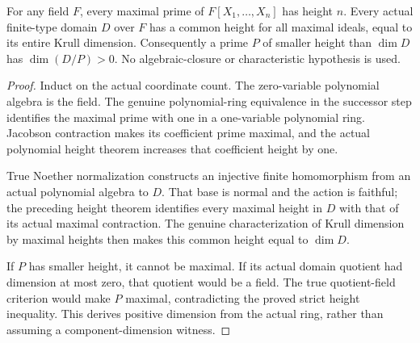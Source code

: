 \begin{theorem}
\label{algebra:affine-domain-maximal-height}
\leanok
{}
For any field $F$, every maximal prime of $F[X_1,\ldots,X_n]$ has
height $n$. Every actual finite-type domain $D$ over $F$ has a common
height for all maximal ideals, equal to its entire Krull dimension.
Consequently a prime $P$ of smaller height than $\dim D$ has
$\dim(D/P)>0$. No algebraic-closure or characteristic hypothesis is used.
\end{theorem}
\begin{proof}
Induct on the actual coordinate count. The zero-variable polynomial
algebra is the field. The genuine polynomial-ring equivalence in the
successor step identifies the maximal prime with one in a one-variable
polynomial ring. Jacobson contraction makes its coefficient prime
maximal, and the actual polynomial height theorem increases that
coefficient height by one.

True Noether normalization constructs an injective finite homomorphism
from an actual polynomial algebra to $D$. That base is normal and the
action is faithful; the preceding height theorem identifies every
maximal height in $D$ with that of its actual maximal contraction.
The genuine characterization of Krull dimension by maximal heights
then makes this common height equal to $\dim D$.

If $P$ has smaller height, it cannot be maximal. If its actual domain
quotient had dimension at most zero, that quotient would be a field.
The true quotient-field criterion would make $P$ maximal, contradicting
the proved strict height inequality. This derives positive dimension
from the actual ring, rather than assuming a component-dimension witness.
\end{proof}

